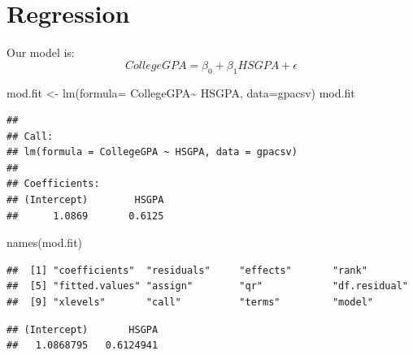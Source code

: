 \documentclass[
]{book}
\newenvironment{Shaded}{\begin{snugshade}}{\end{snugshade}}
\newcommand{\AttributeTok}[1]{\textcolor[rgb]{0.77,0.63,0.00}{#1}}
\newcommand{\DecValTok}[1]{\textcolor[rgb]{0.00,0.00,0.81}{#1}}
\newcommand{\FunctionTok}[1]{\textcolor[rgb]{0.00,0.00,0.00}{#1}}
\newcommand{\NormalTok}[1]{#1}
\newcommand{\OtherTok}[1]{\textcolor[rgb]{0.56,0.35,0.01}{#1}}
\newcommand{\SpecialCharTok}[1]{\textcolor[rgb]{0.00,0.00,0.00}{#1}}
\theoremstyle{definition}
\theoremstyle{definition}
\theoremstyle{definition}
\theoremstyle{definition}
\theoremstyle{remark}
\begin{document}
\hypertarget{regression}{%
\section{Regression}\label{regression}}

Our model is:\[CollegeGPA=\beta_0+\beta_1HSGPA+\epsilon\]

\begin{Shaded}
\begin{Highlighting}[]
\NormalTok{mod.fit }\OtherTok{\textless{}{-}} \FunctionTok{lm}\NormalTok{(}\AttributeTok{formula=}\NormalTok{ CollegeGPA}\SpecialCharTok{\textasciitilde{}}\NormalTok{ HSGPA, }\AttributeTok{data=}\NormalTok{gpacsv)}
\NormalTok{mod.fit}
\end{Highlighting}
\end{Shaded}

\begin{verbatim}
## 
## Call:
## lm(formula = CollegeGPA ~ HSGPA, data = gpacsv)
## 
## Coefficients:
## (Intercept)        HSGPA  
##      1.0869       0.6125
\end{verbatim}

\begin{Shaded}
\begin{Highlighting}[]
\FunctionTok{names}\NormalTok{(mod.fit)}
\end{Highlighting}
\end{Shaded}

\begin{verbatim}
##  [1] "coefficients"  "residuals"     "effects"       "rank"         
##  [5] "fitted.values" "assign"        "qr"            "df.residual"  
##  [9] "xlevels"       "call"          "terms"         "model"
\end{verbatim}

\begin{Shaded}
\end{Shaded}

\begin{verbatim}
## (Intercept)       HSGPA 
##   1.0868795   0.6124941
\end{verbatim}

\begin{Shaded}
\end{Shaded}
\end{document}
